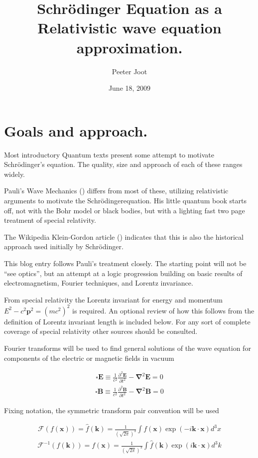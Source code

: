 \documentclass[]{eliblog}
\title{Schr\"{o}dinger Equation as a Relativistic wave equation approximation.}
\author{Peeter Joot}
\date{June 18, 2009}
\newcommand{\BB}[0]{\mathbf{B}}
\newcommand{\BE}[0]{\mathbf{E}}
\newcommand{\Bk}[0]{\mathbf{k}}
\newcommand{\Bp}[0]{\mathbf{p}}
\newcommand{\Bx}[0]{\mathbf{x}}
\newcommand{\spacegrad}[0]{\boldsymbol{\nabla}}
\newcommand{\delambertian}[0]{\square}
\newcommand{\inv}[1]{\frac{1}{#1}}
\newcommand{\FF}[0]{\mathcal{F}}
\newcommand{\Schrodinger}[0]{Schr\"{o}dinger}
\begin{document}
\maketitle

\section{Goals and approach.}

Most introductory Quantum texts present some attempt to motivate \Schrodinger's equation.  The quality, size and approach of each of these ranges widely.
 
Pauli's Wave Mechanics (\cite{pauli2000wm}) differs from most of these, utilizing relativistic arguments to motivate the \Schrodinger equation.  His little quantum book starts off, not with the Bohr model or black bodies, but with a lighting fast two page treatment of special relativity.

The Wikipedia Klein-Gordon article (\cite{wikiKG}) indicates that this is also the historical approach used initially by \Schrodinger.

This blog entry follows Pauli's treatment closely.  The starting point will not be ``see optics'', but an attempt at a logic progression building on basic results of electromagnetism, Fourier techniques, and Lorentz invariance.

From special relativity the Lorentz invariant for energy and momentum $E^2 - c^2 \Bp^2 = (m c^2)^2$ is required.  An optional review of how this follows from the definition of Lorentz invariant length is included below.  For any sort
of complete coverage of special relativity other sources should be consulted.

Fourier transforms will be used to find general solutions of the wave equation for components of the electric or magnetic fields in vacuum

\begin{align}\label{eqn:waveE}
\delambertian \BE \equiv \inv{c^2} \frac{\partial^2 \BE}{\partial t^2} - \spacegrad^2 \BE = 0
\end{align}
\begin{align}\label{eqn:waveB}
\delambertian \BB \equiv \inv{c^2} \frac{\partial^2 \BB}{\partial t^2} - \spacegrad^2 \BB = 0
\end{align}

Fixing notation, the symmetric transform pair convention will be used

\begin{align}\label{eqn:Fourier}
\FF(f(\Bx)) = \hat{f}(\Bk) = \inv{(\sqrt{2\pi})^3} \int f(\Bx) \exp\left( -i \Bk \cdot \Bx \right) d^3 x 
\end{align}
\begin{align}\label{eqn:InvFourier}
\FF^{-1}({f}(\Bk)) = f(\Bx) = \inv{(\sqrt{2\pi})^3} \int \hat{f}(\Bk) \exp\left( i \Bk \cdot \Bx \right) d^3 k
\end{align}
\end{document}
